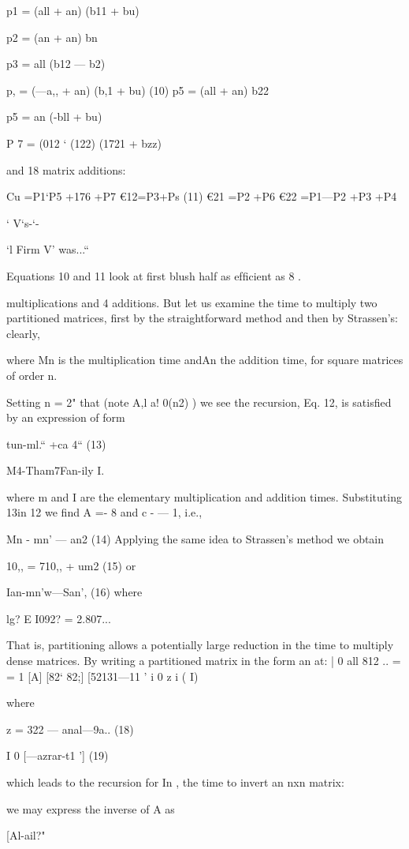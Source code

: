 {{{{{{{{{{{{{{{p1 = (all + an) (b11 + bu)

p2 = (an + an) bn

p3 = all (b12 — b2)

p, = (—a,, + an) (b,1 + bu) (10)
p5 = (all + an) b22

p5 = an (-bll + bu)

P 7 = (012 ‘ (122) (1721 + bzz)

and 18 matrix additions:

Cu =P1‘P5 +176 +P7
€12=P3+Ps
(11)
€21 =P2 +P6
€22 =P1—P2 +P3 +P4

‘ V‘s-‘-

‘l Firm V' was...“

Equations 10 and 11 look at first blush half as efﬁcient as 8 .

multiplications and 4 additions. But let us examine the time to
multiply two partitioned matrices, first by the straightforward
method and then by Strassen's: clearly,

where Mn is the multiplication time andAn the addition time, for
square matrices of order n.

Setting n = 2" that (note A,l a! 0(n2) ) we see the recursion,
Eq. 12, is satisﬁed by an expression of form

tun-ml.“ +ca 4“ (13)

M4-Tham7Fan-ily I.

where m and I are the elementary multiplication and addition
times. Substituting 13in 12 we ﬁnd A =- 8 and c - — 1, i.e.,

Mn - mn’ — an2 (14)
Applying the same idea to Strassen’s method we obtain

10,, = 710,, + um2 (15)
or

Ian-mn’w—San’, (16)
where

lg? E I092? = 2.807...

That is, partitioning allows a potentially large reduction in the
time to multiply dense matrices.
By writing a partitioned matrix in the form
an at: | 0 all 812 ..
= = 1
[A] [82‘ 82;] [52131—11 ' i 0 z i ( I)

where

 

z = 322 — anal—9a.. (18)

I 0
[—azrar-t1 '] (19)

which leads to the recursion for In , the time to invert an nxn
matrix:

we may express the inverse of A as

[Al-ail?"

}}}}}}}}}}}}}}}
